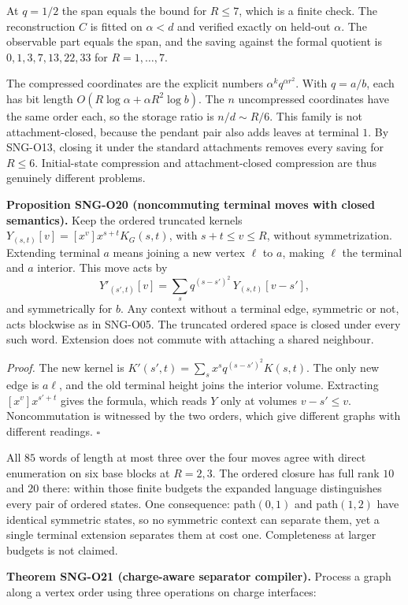 \documentclass[
  11pt,
  a4paper,
]{report}
\begin{document}
At \(q=1/2\) the span equals the bound for \(R\le7\), which is a finite
check. The reconstruction \(C\) is fitted on \(\alpha<d\) and verified
exactly on held-out \(\alpha\). The observable part equals the span, and
the saving against the formal quotient is \(0,1,3,7,13,22,33\) for
\(R=1,\ldots,7\).

The compressed coordinates are the explicit numbers
\(\alpha^kq^{\alpha r^2}\). With \(q=a/b\), each has bit length
\(O(R\log\alpha+\alpha R^2\log b)\). The \(n\) uncompressed coordinates
have the same order each, so the storage ratio is \(n/d\sim R/6\). This
family is not attachment-closed, because the pendant pair also adds
leaves at terminal \(1\). By SNG-O13, closing it under the standard
attachments removes every saving for \(R\le6\). Initial-state
compression and attachment-closed compression are thus genuinely
different problems.

\textbf{Proposition SNG-O20 (noncommuting terminal moves with closed
semantics).} Keep the ordered truncated kernels
\(Y_{(s,t)}[v]=[x^v]x^{s+t}K_G(s,t)\), with \(s+t\le v\le R\), without
symmetrization. Extending terminal \(a\) means joining a new vertex
\(\ell\) to \(a\), making \(\ell\) the terminal and \(a\) interior. This
move acts by \[
Y'_{(s',t)}[v]=\sum_sq^{(s-s')^2}\,Y_{(s,t)}[v-s'],
\] and symmetrically for \(b\). Any context without a terminal edge,
symmetric or not, acts blockwise as in SNG-O05. The truncated ordered
space is closed under every such word. Extension does not commute with
attaching a shared neighbour.

\emph{Proof.} The new kernel is
\(K'(s',t)=\sum_sx^sq^{(s-s')^2}K(s,t)\). The only new edge is
\(a\ell\), and the old terminal height joins the interior volume.
Extracting \([x^v]x^{s'+t}\) gives the formula, which reads \(Y\) only
at volumes \(v-s'\le v\). Noncommutation is witnessed by the two orders,
which give different graphs with different readings. \(\square\)

All \(85\) words of length at most three over the four moves agree with
direct enumeration on six base blocks at \(R=2,3\). The ordered closure
has full rank \(10\) and \(20\) there: within those finite budgets the
expanded language distinguishes every pair of ordered states. One
consequence: path\((0,1)\) and path\((1,2)\) have identical symmetric
states, so no symmetric context can separate them, yet a single terminal
extension separates them at cost one. Completeness at larger budgets is
not claimed.

\textbf{Theorem SNG-O21 (charge-aware separator compiler).} Process a
graph along a vertex order using three operations on charge interfaces:
\end{document}
